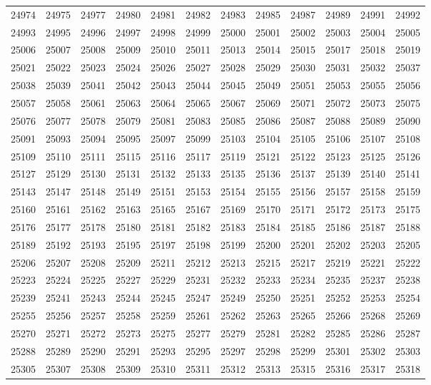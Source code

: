 \begin{center}
\begin{longtable}{llllllllllll}
24974 &24975 &24977 &24980 &24981 &24982 &24983 &24985 &24987 &24989 &24991 &24992 \\
24993 &24995 &24996 &24997 &24998 &24999 &25000 &25001 &25002 &25003 &25004 &25005 \\
25006 &25007 &25008 &25009 &25010 &25011 &25013 &25014 &25015 &25017 &25018 &25019 \\
25021 &25022 &25023 &25024 &25026 &25027 &25028 &25029 &25030 &25031 &25032 &25037 \\
25038 &25039 &25041 &25042 &25043 &25044 &25045 &25049 &25051 &25053 &25055 &25056 \\
25057 &25058 &25061 &25063 &25064 &25065 &25067 &25069 &25071 &25072 &25073 &25075 \\
25076 &25077 &25078 &25079 &25081 &25083 &25085 &25086 &25087 &25088 &25089 &25090 \\
25091 &25093 &25094 &25095 &25097 &25099 &25103 &25104 &25105 &25106 &25107 &25108 \\
25109 &25110 &25111 &25115 &25116 &25117 &25119 &25121 &25122 &25123 &25125 &25126 \\
25127 &25129 &25130 &25131 &25132 &25133 &25135 &25136 &25137 &25139 &25140 &25141 \\
25143 &25147 &25148 &25149 &25151 &25153 &25154 &25155 &25156 &25157 &25158 &25159 \\
25160 &25161 &25162 &25163 &25165 &25167 &25169 &25170 &25171 &25172 &25173 &25175 \\
25176 &25177 &25178 &25180 &25181 &25182 &25183 &25184 &25185 &25186 &25187 &25188 \\
25189 &25192 &25193 &25195 &25197 &25198 &25199 &25200 &25201 &25202 &25203 &25205 \\
25206 &25207 &25208 &25209 &25211 &25212 &25213 &25215 &25217 &25219 &25221 &25222 \\
25223 &25224 &25225 &25227 &25229 &25231 &25232 &25233 &25234 &25235 &25237 &25238 \\
25239 &25241 &25243 &25244 &25245 &25247 &25249 &25250 &25251 &25252 &25253 &25254 \\
25255 &25256 &25257 &25258 &25259 &25261 &25262 &25263 &25265 &25266 &25268 &25269 \\
25270 &25271 &25272 &25273 &25275 &25277 &25279 &25281 &25282 &25285 &25286 &25287 \\
25288 &25289 &25290 &25291 &25293 &25295 &25297 &25298 &25299 &25301 &25302 &25303 \\
25305 &25307 &25308 &25309 &25310 &25311 &25312 &25313 &25315 &25316 &25317 &25318 \\

\end{longtable}
\end{center}
